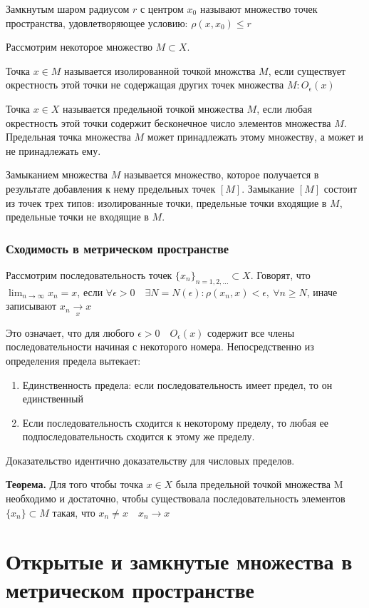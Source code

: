 \documentclass[12pt]{report}
\newcommand{\be}{\begin{enumerate}}
\newcommand{\ee}{\end{enumerate}}
\renewcommand{\[}{$\\\displaystyle}
\renewcommand{\]}{\\$}
\renewcommand{\[}{$\\\displaystyle}
\newcommand{\sep}{,\ }
\newcommand{\tth}[1][]{\textbf{Теорема#1.}}
\begin{document}
Замкнутым шаром радиусом $r$ с центром $x_0$ называют множество точек пространства, удовлетворяющее условию: $\rho(x, x_0) \leq r$

Рассмотрим некоторое множество $M \subset X$.

Точка $x \in M$ называется изолированной точкой множства $M$, если существует окрестность этой точки не содержащая других точек множества $M: O_\epsilon(x)$

Точка $x \in X$ называется предельной точкой множества $M$, если любая окрестность этой точки содержит бесконечное число элементов множества $M$. Предельная точка множества $M$ может принадлежать этому множеству, а может и не принадлежать ему.

Замыканием множества $M$ называется множество, которое получается в результате добавления к нему предельных точек $[M]$. Замыкание $[M]$ состоит из точек трех типов: изолированные точки, предельные точки входящие в $M$, предельные точки не входящие в $M$.

\subsubsection{Сходимость в метрическом пространстве}

Рассмотрим последовательность точек $\{x_n\}_{n=1,2,\dots}\subset X$. Говорят, что $\lim_{n \rightarrow \infty} x_n = x$, если $\forall \epsilon > 0\quad \exists N = N(\epsilon): \rho(x_n, x)<\epsilon\sep\forall n \geq N$, иначе записывают $x_n\xrightarrow[x]{}x$

Это означает, что для любого $\epsilon > 0 \quad O_\epsilon(x)$ содержит все члены последовательности начиная с некоторого номера. Непосредственно из определения предела вытекает:

\be
  \item Единственность предела: если последовательность имеет предел, то он единственный

  \item Если последовательность сходится к некоторому пределу, то любая ее подпоследовательность сходится к этому же пределу.
\ee

Доказательство идентично доказательству для числовых пределов.

\tth[] Для того чтобы точка $x \in X$ была предельной точкой множества M необходимо и достаточно, чтобы существовала последовательность элементов $\{x_n\}\subset M$ такая, что $x_n\neq x\quad x_n\rightarrow x$

\section{Открытые и замкнутые множества в метрическом пространстве}
\end{document}
